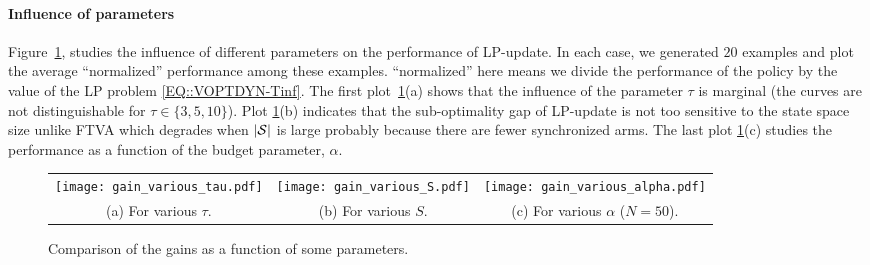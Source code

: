 \paragraph{Influence of parameters} Figure~\ref{fig:gain_function_parameters}, studies the influence of different parameters on the performance of LP-update. In each case, we generated $20$ examples and plot the average ``normalized'' performance among these examples. %
``normalized'' here means we divide the performance of the policy by the value of the LP problem \eqref{EQ::VOPTDYN-Tinf}. The first plot~\ref{fig:gain_function_parameters}(a) shows that the influence of the parameter $\tau$ is marginal (the curves are not distinguishable for $\tau\in\{3,5,10\}$).  Plot \ref{fig:gain_function_parameters}(b) indicates that the sub-optimality gap of LP-update is not too sensitive to the state space size unlike FTVA which degrades when $|\mathcal{S}|$ is large probably because there are fewer synchronized arms. The last plot \ref{fig:gain_function_parameters}(c) studies the performance as a function of the budget parameter, $\alpha$. %
\begin{figure}[t]
    \centering
    \begin{tabular}{@{}c@{}c@{}c@{}}
        \texttt{[image: gain\_various\_tau.pdf]}
        &\texttt{[image: gain\_various\_S.pdf]}
        &\texttt{[image: gain\_various\_alpha.pdf]}\\
        (a) For various $\tau$.
        &(b) For various $S$.
        &(c) For various $\alpha$ ($N=50$).
    \end{tabular}

    \caption{Comparison of the gains as a function of some parameters.}
    \label{fig:gain_function_parameters}
\end{figure}